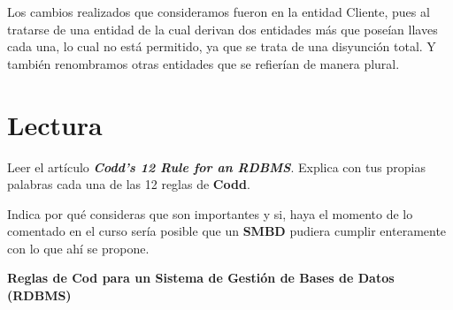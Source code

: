 \documentclass[12pt, letterpaper]{article}
\begin{document}
        Los cambios realizados que consideramos fueron en la entidad Cliente, pues 
        al tratarse de una entidad de la cual derivan dos entidades más que poseían llaves
        cada una, lo cual no está permitido, ya que se trata de una disyunción total.
        Y también renombramos otras entidades que se refierían de manera plural.


    \section{Lectura}
    Leer el artículo \textit{\textbf{Codd's 12 Rule for an RDBMS}}. Explica con
    tus propias palabras cada una de las 12 reglas de \textbf{Codd}.\vspace{.3cm}

    Indica por qué consideras que son importantes y si, haya el momento de lo
    comentado en el curso sería posible que un \textbf{SMBD} pudiera cumplir
    enteramente con lo que ahí se propone.\vspace{.3cm}

    \textbf{Reglas de Cod para un Sistema de Gestión de Bases de Datos (RDBMS)}\vspace{.3cm}
\end{document}
